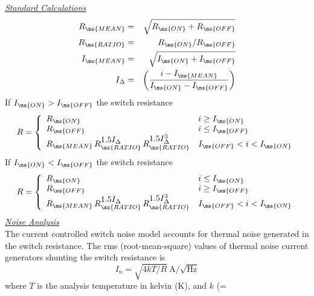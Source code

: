 \noindent\underline{\sl \large Standard Calculations}\\[0.1in]
\begin{eqnarray}
R_{\ms{MEAN}} & = & \sqrt{R_{\ms{ON}} + R_{\ms{OFF}}} \\
R_{\ms{RATIO}}& = &       R_{\ms{ON}}/ R_{\ms{OFF}} \\
I_{\ms{MEAN}} & = & \sqrt{I_{\ms{ON}} + I_{\ms{OFF}}} \\
I_{\Delta}& = & \left({{\textstyle i - I_{\ms{MEAN}}} \over
              {\textstyle I_{\ms{ON}}- I_{\ms{OFF}}}}\right)
\end{eqnarray}
If $I_{\ms{ON}}> I_{\ms{OFF}}$ the switch resistance
\begin{equation}
R = \left\{
\begin{array}{ll}
R_{\ms{ON}}                            & i \ge I_{\ms{ON}} \\
R_{\ms{OFF}}                            & i \le I_{\ms{OFF}}\\
R_{\ms{MEAN}}\,
  R_{\ms{RATIO}}^{\textstyle 1.5 I_{\Delta}}\,
  R_{\ms{RATIO}}^{\textstyle 1.5 I_{\Delta}^3}
  & I_{\ms{OFF}} < i < I_{\ms{ON}} \\
\end{array} \right. %
\end{equation}
If $I_{\ms{ON}}< I_{\ms{OFF}}$ the switch resistance
\begin{equation}
R = \left\{
\begin{array}{ll}
R_{\ms{ON}}                            & i \le I_{\ms{ON}} \\
R_{\ms{OFF}}                            & i \ge I_{\ms{OFF}}\\
R_{\ms{MEAN}}\,
  R_{\ms{RATIO}}^{\textstyle 1.5 I_{\Delta}}\,
  R_{\ms{RATIO}}^{\textstyle 1.5 I_{\Delta}^3}
  & I_{\ms{OFF}} < i < I_{\ms{ON}} \\
\end{array} \right. %
\end{equation}
\noindent\underline{\sl \large Noise Analysis}\\[0.1in]
 
 The current controlled switch noise
model accounts for thermal noise generated in the switch
resistance. The rms (root-mean-square) values of thermal noise
current generators shunting the switch resistance is
\begin{equation}
I_{n} = \sqrt{4kT/R}~\mbox{A/}\sqrt{\mbox{Hz}}
\end{equation}
where $T$ is the analysis temperature in kelvin (K), and $k$ (=

